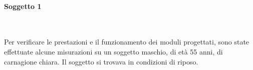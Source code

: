 \paragraph{Soggetto 1}~

Per verificare le prestazioni e il funzionamento dei moduli progettati, sono state effettuate alcune misurazioni su un soggetto maschio, di età 55 anni, di carnagione chiara. Il soggetto si trovava in condizioni di riposo.